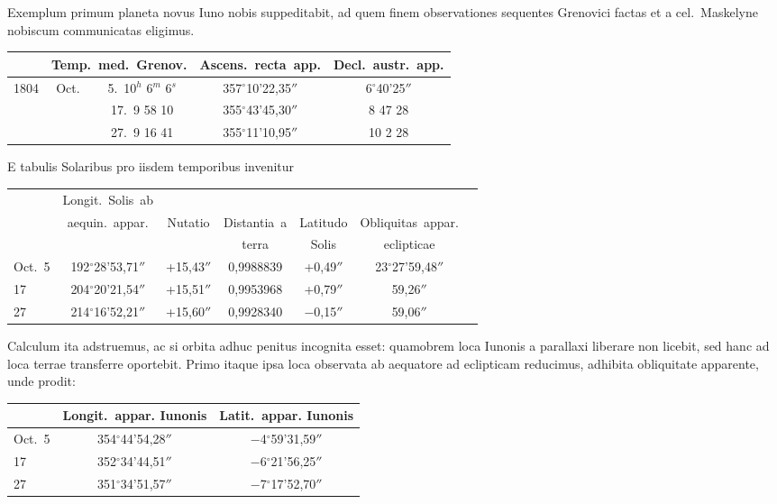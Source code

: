 \documentclass[12pt,a4paper]{article}
\begin{document}
Exemplum primum planeta novus Iuno nobis suppeditabit, ad quem finem observationes sequentes Grenovici factas et a cel.~Maskelyne nobiscum communicatas eligimus.

\begin{center}
\begin{tabular}{lcccc}
\toprule
& \multicolumn{2}{c}{Temp.~med.~Grenov.} & Ascens.~recta~app. & Decl.~austr.~app.\\
\midrule
1804 & Oct. & 5.\ 10$^h$ 6$^m$ 6$^s$ & 357$^\circ$10'22,35$''$ & 6$^\circ$40'25$''$ \\
& & 17.\ 9 58 10 & 355$^\circ$43'45,30$''$ & 8 47 28 \\
& & 27.\ 9 16 41 & 355$^\circ$11'10,95$''$ & 10 2 28 \\
\bottomrule
\end{tabular}
\end{center}

E tabulis Solaribus pro iisdem temporibus invenitur

\begin{center}
\begin{tabular}{lcccccc}
\toprule
& Longit.~Solis~ab & & & & & \\
& aequin.~appar. & Nutatio & Distantia~a & Latitudo & Obliquitas~appar.\\
& & & terra & Solis & eclipticae\\
\midrule
Oct.\ 5 & 192$^\circ$28'53,71$''$ & +15,43$''$ & 0,9988839 & +0,49$''$ & 23$^\circ$27'59,48$''$\\
17 & 204$^\circ$20'21,54$''$ & +15,51$''$ & 0,9953968 & +0,79$''$ & 59,26$''$\\
27 & 214$^\circ$16'52,21$''$ & +15,60$''$ & 0,9928340 & $-$0,15$''$ & 59,06$''$\\
\bottomrule
\end{tabular}
\end{center}


Calculum ita adstruemus, ac si orbita adhuc penitus incognita esset: quamobrem loca Iunonis a parallaxi liberare non licebit, sed hanc ad loca terrae transferre oportebit. Primo itaque ipsa loca observata ab aequatore ad eclipticam reducimus, adhibita obliquitate apparente, unde prodit:

\begin{center}
\begin{tabular}{lcc}
\toprule
& Longit.~appar. Iunonis & Latit.~appar. Iunonis\\
\midrule
Oct.\ 5 & 354$^\circ$44'54,28$''$ & $-$4$^\circ$59'31,59$''$\\
17 & 352$^\circ$34'44,51$''$ & $-$6$^\circ$21'56,25$''$\\
27 & 351$^\circ$34'51,57$''$ & $-$7$^\circ$17'52,70$''$\\
\bottomrule
\end{tabular}
\end{center}
\end{document}
